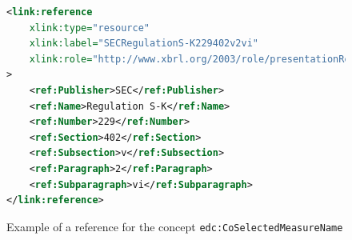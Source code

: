 \begin{figure}[H]
    \begin{lstlisting}[language=XML, basicstyle=\ttfamily\small]
<link:reference 
    xlink:type="resource" 
    xlink:label="SECRegulationS-K229402v2vi" 
    xlink:role="http://www.xbrl.org/2003/role/presentationRef"
>
    <ref:Publisher>SEC</ref:Publisher>
    <ref:Name>Regulation S-K</ref:Name>
    <ref:Number>229</ref:Number>
    <ref:Section>402</ref:Section>
    <ref:Subsection>v</ref:Subsection>
    <ref:Paragraph>2</ref:Paragraph>
    <ref:Subparagraph>vi</ref:Subparagraph>
</link:reference>
\end{lstlisting}
    \caption{Example of a reference for the concept \texttt{edc:CoSelectedMeasureName}}
    \label{fig:example_reference_xml}
\end{figure}







